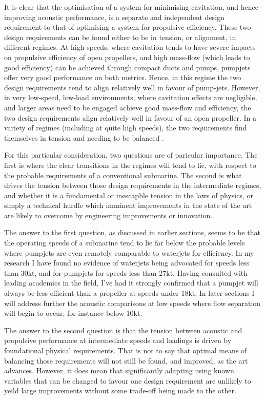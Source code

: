 \documentclass{article}\usepackage[]{graphicx}\usepackage[]{color}
\begin{document}
It is clear that the optimisation of a system for minimising cavitation, and hence improving acoustic performance, is a separate and independent design requirement to that of optimising a system for propulsive efficiency.  These two design requirements can be found either to be in tension, or alignment, in different regimes.  At high speeds, where cavitation tends to have severe impacts on propulsive efficiency of open propellers, and high mass-flow (which leads to good efficiency) can be achieved through compact ducts and pumps, pumpjets offer very good performance on both metrics.  Hence, in this regime the two design requirements tend to align relatively well in favour of pump-jets.  However, in very low-speed, low-load environments, where cavitation effects are negligible, and larger areas need to be engaged achieve good mass-flow and efficiency, the two design requirements align relatively well in favour of an open propeller.  In a variety of regimes (including at quite high speeds), the two requirements find themselves in tension and needing to be balanced \parencite{gearhart1966selection}.

For this particular consideration, two questions are of paricular importance.  The first is where the clear transitions in the regimes will tend to lie, with respect to the probable requirements of a conventional submarine.  The second is what drives the tension between those design requirements in the intermediate regimes, and whether it is a fundamental or inescapble tension in the laws of physics, or simply a technical hurdle which imminent improvements in the state of the art are likely to overcome by engineering improvements or innovation.

The answer to the first question, as discussed in earlier sections, seems to be that the operating speeds of a submarine tend to lie far below the probable levels where pumpjets are even remotely comparable to waterjets for efficiency.  In my research I have found no evidence of waterjets being advocated for speeds less than 30kt, and for pumpjets for speeds less than 27kt.  Having consulted with leading academics in the field, I've had it strongly confirmed that a pumpjet will always be less efficient than a propeller at speeds under 18kt.  In later sections I will address further the acoustic comparisons at low speeds where flow separation will begin to occur, for instance below 10kt.

The answer to the second question is that the tension between acoustic and propulsive performance at intermediate speeds and loadings is driven by foundational physical requirements.  That is not to say that optimal means of balancing those requirements will not still be found, and improved, as the art advances.  However, it does mean that significantly adapting using known variables that can be changed to favour one design requirement are unlikely to yeild large improvements without some trade-off being made to the other.
\end{document}
